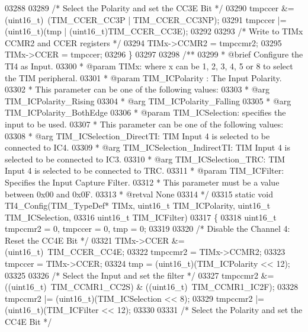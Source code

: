 \begin{DoxyCode}
03288 
03289   \textcolor{comment}{/* Select the Polarity and set the CC3E Bit */}
03290   tmpccer &= (uint16\_t)~(TIM_CCER_CC3P | TIM_CCER_CC3NP);
03291   tmpccer |= (uint16\_t)(tmp | (uint16\_t)TIM_CCER_CC3E);
03292 
03293   \textcolor{comment}{/* Write to TIMx CCMR2 and CCER registers */}
03294   TIMx->CCMR2 = tmpccmr2;
03295   TIMx->CCER = tmpccer;
03296 \}
03297 
03298 \textcolor{comment}{/**}
03299 \textcolor{comment}{  * @brief  Configure the TI4 as Input.}
03300 \textcolor{comment}{  * @param  TIMx: where x can be 1, 2, 3, 4, 5 or 8 to select the TIM peripheral.}
03301 \textcolor{comment}{  * @param  TIM\_ICPolarity : The Input Polarity.}
03302 \textcolor{comment}{  *          This parameter can be one of the following values:}
03303 \textcolor{comment}{  *            @arg TIM\_ICPolarity\_Rising}
03304 \textcolor{comment}{  *            @arg TIM\_ICPolarity\_Falling}
03305 \textcolor{comment}{  *            @arg TIM\_ICPolarity\_BothEdge     }
03306 \textcolor{comment}{  * @param  TIM\_ICSelection: specifies the input to be used.}
03307 \textcolor{comment}{  *          This parameter can be one of the following values:}
03308 \textcolor{comment}{  *            @arg TIM\_ICSelection\_DirectTI: TIM Input 4 is selected to be connected to IC4.}
03309 \textcolor{comment}{  *            @arg TIM\_ICSelection\_IndirectTI: TIM Input 4 is selected to be connected to IC3.}
03310 \textcolor{comment}{  *            @arg TIM\_ICSelection\_TRC: TIM Input 4 is selected to be connected to TRC.}
03311 \textcolor{comment}{  * @param  TIM\_ICFilter: Specifies the Input Capture Filter.}
03312 \textcolor{comment}{  *          This parameter must be a value between 0x00 and 0x0F.}
03313 \textcolor{comment}{  * @retval None}
03314 \textcolor{comment}{  */}
03315 \textcolor{keyword}{static} \textcolor{keywordtype}{void} TI4_Config(TIM\_TypeDef* TIMx, uint16\_t TIM\_ICPolarity, uint16\_t TIM\_ICSelection,
03316                        uint16\_t TIM\_ICFilter)
03317 \{
03318   uint16\_t tmpccmr2 = 0, tmpccer = 0, tmp = 0;
03319 
03320   \textcolor{comment}{/* Disable the Channel 4: Reset the CC4E Bit */}
03321   TIMx->CCER &= (uint16\_t)~TIM_CCER_CC4E;
03322   tmpccmr2 = TIMx->CCMR2;
03323   tmpccer = TIMx->CCER;
03324   tmp = (uint16\_t)(TIM\_ICPolarity << 12);
03325 
03326   \textcolor{comment}{/* Select the Input and set the filter */}
03327   tmpccmr2 &= ((uint16\_t)~TIM_CCMR1_CC2S) & ((uint16\_t)~TIM_CCMR1_IC2F);
03328   tmpccmr2 |= (uint16\_t)(TIM\_ICSelection << 8);
03329   tmpccmr2 |= (uint16\_t)(TIM\_ICFilter << 12);
03330 
03331   \textcolor{comment}{/* Select the Polarity and set the CC4E Bit */}

\end{DoxyCode}
